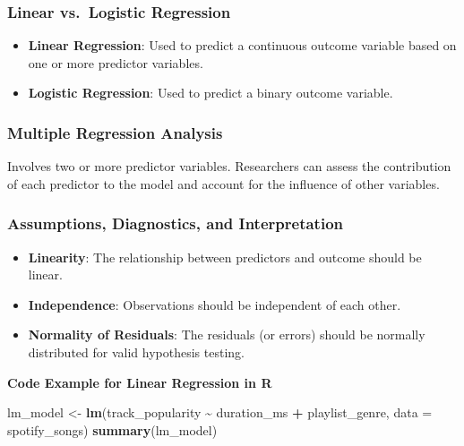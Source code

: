 \documentclass[
  b5paper]{book}
\newenvironment{Shaded}{\begin{snugshade}}{\end{snugshade}}
\newcommand{\AttributeTok}[1]{\textcolor[rgb]{0.13,0.29,0.53}{#1}}
\newcommand{\FunctionTok}[1]{\textcolor[rgb]{0.13,0.29,0.53}{\textbf{#1}}}
\newcommand{\NormalTok}[1]{#1}
\newcommand{\OtherTok}[1]{\textcolor[rgb]{0.56,0.35,0.01}{#1}}
\newcommand{\SpecialCharTok}[1]{\textcolor[rgb]{0.81,0.36,0.00}{\textbf{#1}}}
\providecommand{\tightlist}{%
  \setlength{\itemsep}{0pt}\setlength{\parskip}{0pt}}
\begin{document}
\hypertarget{linear-vs.-logistic-regression}{%
\subsubsection{Linear vs.~Logistic Regression}\label{linear-vs.-logistic-regression}}

\begin{itemize}
\tightlist
\item
  \textbf{Linear Regression}: Used to predict a continuous outcome variable based on one or more predictor variables.
\item
  \textbf{Logistic Regression}: Used to predict a binary outcome variable.
\end{itemize}

\hypertarget{multiple-regression-analysis}{%
\subsubsection{Multiple Regression Analysis}\label{multiple-regression-analysis}}

Involves two or more predictor variables. Researchers can assess the contribution of each predictor to the model and account for the influence of other variables.

\hypertarget{assumptions-diagnostics-and-interpretation}{%
\subsubsection{Assumptions, Diagnostics, and Interpretation}\label{assumptions-diagnostics-and-interpretation}}

\begin{itemize}
\tightlist
\item
  \textbf{Linearity}: The relationship between predictors and outcome should be linear.
\item
  \textbf{Independence}: Observations should be independent of each other.
\item
  \textbf{Normality of Residuals}: The residuals (or errors) should be normally distributed for valid hypothesis testing.
\end{itemize}

\textbf{Code Example for Linear Regression in R}

\begin{Shaded}
\begin{Highlighting}[]
\NormalTok{lm\_model }\OtherTok{\textless{}{-}} \FunctionTok{lm}\NormalTok{(track\_popularity }\SpecialCharTok{\textasciitilde{}}\NormalTok{ duration\_ms }\SpecialCharTok{+}\NormalTok{ playlist\_genre, }\AttributeTok{data =}\NormalTok{ spotify\_songs)}
\FunctionTok{summary}\NormalTok{(lm\_model)}
\end{Highlighting}
\end{Shaded}
\end{document}
